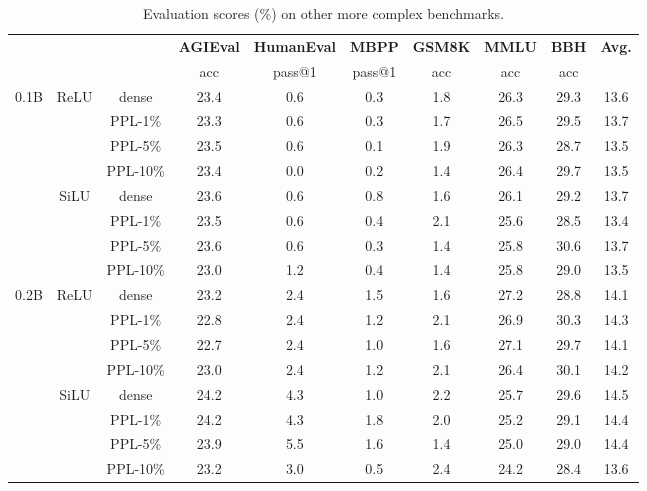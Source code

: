 \documentclass{article} %
\begin{document}
\begin{table}[ht]
\caption{Evaluation scores (\%) on other more complex benchmarks.}
\label{table:other-benchmarks}
\footnotesize
\begin{center}
\begin{tabular}{c|c|c|ccccccc}
\toprule
\multicolumn{3}{c}{} & \textbf{AGIEval} & \textbf{HumanEval} & \textbf{MBPP} & \textbf{GSM8K} & \textbf{MMLU} & \textbf{BBH} & \multirow{2}{*}{\textbf{Avg.}} \\
\cmidrule{4-9}
\multicolumn{3}{c}{} & acc & pass@1 & pass@1 & acc & acc & acc \\

\midrule
\multirow{8}{*}{0.1B} & \multirow{4}{*}{ReLU} 
& dense  & 23.4 & 0.6 & 0.3 & 1.8 & 26.3 & 29.3 & 13.6 \\
& & PPL-1\% & 23.3 & 0.6 & 0.3 & 1.7 & 26.5 & 29.5 & 13.7 \\
& & PPL-5\% & 23.5 & 0.6 & 0.1 & 1.9 & 26.3 & 28.7 & 13.5 \\
& & PPL-10\% & 23.4 & 0.0 & 0.2 & 1.4 & 26.4 & 29.7 & 13.5 \\
\cmidrule{2-10}
& \multirow{4}{*}{SiLU} 
& dense  & 23.6 & 0.6 & 0.8 & 1.6 & 26.1 & 29.2 & 13.7 \\
& & PPL-1\% & 23.5 & 0.6 & 0.4 & 2.1 & 25.6 & 28.5 & 13.4 \\
& & PPL-5\% & 23.6 & 0.6 & 0.3 & 1.4 & 25.8 & 30.6 & 13.7 \\
& & PPL-10\% & 23.0 & 1.2 & 0.4 & 1.4 & 25.8 & 29.0 & 13.5 \\

\midrule
\multirow{8}{*}{0.2B} & \multirow{4}{*}{ReLU} 
& dense  & 23.2 & 2.4 & 1.5 & 1.6 & 27.2 & 28.8 & 14.1 \\
& & PPL-1\% & 22.8 & 2.4 & 1.2 & 2.1 & 26.9 & 30.3 & 14.3 \\
& & PPL-5\% & 22.7 & 2.4 & 1.0 & 1.6 & 27.1 & 29.7 & 14.1 \\
& & PPL-10\% & 23.0 & 2.4 & 1.2 & 2.1 & 26.4 & 30.1 & 14.2 \\
\cmidrule{2-10}
& \multirow{4}{*}{SiLU} 
& dense  & 24.2 & 4.3 & 1.0 & 2.2 & 25.7 & 29.6 & 14.5 \\
& & PPL-1\% & 24.2 & 4.3 & 1.8 & 2.0 & 25.2 & 29.1 & 14.4 \\
& & PPL-5\% & 23.9 & 5.5 & 1.6 & 1.4 & 25.0 & 29.0 & 14.4 \\
& & PPL-10\% & 23.2 & 3.0 & 0.5 & 2.4 & 24.2 & 28.4 & 13.6 \\


\end{tabular}
\end{center}
\end{table}
\end{document}
